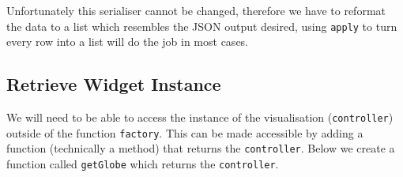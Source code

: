 \documentclass[
  10pt,
]{krantz}
\makeatletter
\newenvironment{Shaded}{\begin{snugshade}}{\end{snugshade}}
\newcommand{\CommentTok}[1]{\textcolor[rgb]{0.37,0.37,0.37}{\textit{#1}}}
\newcommand{\ControlFlowTok}[1]{\textcolor[rgb]{0.27,0.27,0.27}{\textbf{#1}}}
\newcommand{\DataTypeTok}[1]{\textcolor[rgb]{0.27,0.27,0.27}{#1}}
\newcommand{\DecValTok}[1]{\textcolor[rgb]{0.06,0.06,0.06}{#1}}
\newcommand{\KeywordTok}[1]{\textcolor[rgb]{0.27,0.27,0.27}{\textbf{#1}}}
\newcommand{\NormalTok}[1]{#1}
\newcommand{\OperatorTok}[1]{\textcolor[rgb]{0.43,0.43,0.43}{\textbf{#1}}}
\newcommand{\StringTok}[1]{\textcolor[rgb]{0.5,0.5,0.5}{#1}}
\newenvironment{kframe}{%
\medskip{}
\setlength{\fboxsep}{.8em}
 \def\at@end@of@kframe{}%
 \ifinner\ifhmode%
  \def\at@end@of@kframe{\end{minipage}}%
  \begin{minipage}{\columnwidth}%
 \fi\fi%
 \def\FrameCommand##1{\hskip\@totalleftmargin \hskip-\fboxsep
 \colorbox{shadecolor}{##1}\hskip-\fboxsep
     \hskip-\linewidth \hskip-\@totalleftmargin \hskip\columnwidth}%
 \MakeFramed {\advance\hsize-\width
   \@totalleftmargin\z@ \linewidth\hsize
   \@setminipage}}%
 {\par\unskip\endMakeFramed%
 \at@end@of@kframe}
\renewenvironment{Shaded}{\begin{kframe}}{\end{kframe}}
\makeatother
\begin{document}
Unfortunately this serialiser cannot be changed, therefore we have to reformat the data to a list which resembles the JSON output desired, using \texttt{apply} to turn every row into a list will do the job in most cases.

\begin{Shaded}
\end{Shaded}

\hypertarget{shiny-widgets-retrieve}{%
\subsection{Retrieve Widget Instance}\label{shiny-widgets-retrieve}}

We will need to be able to access the instance of the visualisation (\texttt{controller}) outside of the function \texttt{factory}. This can be made accessible by adding a function (technically a method) that returns the \texttt{controller}. Below we create a function called \texttt{getGlobe} which returns the \texttt{controller}.
\end{document}

